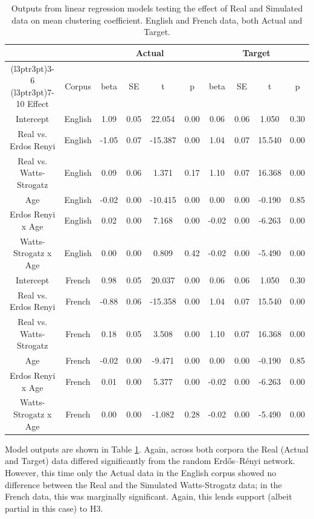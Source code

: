 \documentclass[
  english,
  man,floatsintext]{apa6}
\begin{document}
\begin{longtable}[t]{cccccccccc}
\caption{\label{tab:table-clust}Outputs from linear regression models testing the effect of Real and Simulated data on mean clustering coefficient. English and French data, both Actual and Target.}\\
\toprule
\multicolumn{2}{c}{ } & \multicolumn{4}{c}{Actual} & \multicolumn{4}{c}{Target} \\
\cmidrule(l{3pt}r{3pt}){3-6} \cmidrule(l{3pt}r{3pt}){7-10}
Effect & Corpus & beta & SE & t & p & beta & SE & t & p\\
\midrule
Intercept & English & 1.09 & 0.05 & 22.054 & 0.00 & 0.06 & 0.06 & 1.050 & 0.30\\
Real vs. Erdos Renyi & English & -1.05 & 0.07 & -15.387 & 0.00 & 1.04 & 0.07 & 15.540 & 0.00\\
Real vs. Watts-Strogatz & English & 0.09 & 0.06 & 1.371 & 0.17 & 1.10 & 0.07 & 16.368 & 0.00\\
Age & English & -0.02 & 0.00 & -10.415 & 0.00 & 0.00 & 0.00 & -0.190 & 0.85\\
Erdos Renyi x Age & English & 0.02 & 0.00 & 7.168 & 0.00 & -0.02 & 0.00 & -6.263 & 0.00\\
\addlinespace
Watts-Strogatz x Age & English & 0.00 & 0.00 & 0.809 & 0.42 & -0.02 & 0.00 & -5.490 & 0.00\\
\midrule
Intercept & French & 0.98 & 0.05 & 20.037 & 0.00 & 0.06 & 0.06 & 1.050 & 0.30\\
Real vs. Erdos Renyi & French & -0.88 & 0.06 & -15.358 & 0.00 & 1.04 & 0.07 & 15.540 & 0.00\\
Real vs. Watts-Strogatz & French & 0.18 & 0.05 & 3.508 & 0.00 & 1.10 & 0.07 & 16.368 & 0.00\\
Age & French & -0.02 & 0.00 & -9.471 & 0.00 & 0.00 & 0.00 & -0.190 & 0.85\\
\addlinespace
Erdos Renyi x Age & French & 0.01 & 0.00 & 5.377 & 0.00 & -0.02 & 0.00 & -6.263 & 0.00\\
Watts-Strogatz x Age & French & 0.00 & 0.00 & -1.082 & 0.28 & -0.02 & 0.00 & -5.490 & 0.00\\
\bottomrule
\end{longtable}

Model outputs are shown in Table \ref{tab:table-clust}. Again, across both corpora the Real (Actual and Target) data differed significantly from the random Erdős--Rényi network. However, this time only the Actual data in the English corpus showed no difference between the Real and the Simulated Watts-Strogatz data; in the French data, this was marginally significant. Again, this lends support (albeit partial in this case) to H3.
\end{document}
